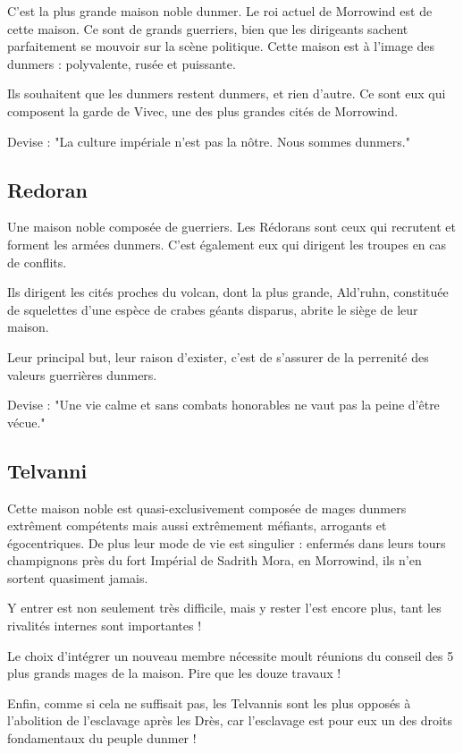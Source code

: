       C'est la plus grande maison noble dunmer. Le roi actuel de Morrowind est de cette maison. Ce sont de grands guerriers, bien que les dirigeants sachent parfaitement se mouvoir sur la scène politique. Cette maison est à l'image des dunmers : polyvalente, rusée et puissante.
      
      Ils souhaitent que les dunmers restent dunmers, et rien d'autre. Ce sont eux qui composent la garde de Vivec, une des plus grandes cités de Morrowind.
      
      Devise : "La culture impériale n'est pas la nôtre. Nous sommes dunmers."
    
    \subsection{Redoran}
    
      Une maison noble composée de guerriers. Les Rédorans sont ceux qui recrutent et forment les armées dunmers. C'est également eux qui dirigent les troupes en cas de conflits.
      
      Ils dirigent les cités proches du volcan, dont la plus grande, Ald'ruhn, constituée de squelettes d'une espèce de crabes géants disparus, abrite le siège de leur maison.
      
      Leur principal but, leur raison d'exister, c'est de s'assurer de la perrenité des valeurs guerrières dunmers.
      
      Devise : "Une vie calme et sans combats honorables ne vaut pas la peine d'être vécue."
    
    \subsection{Telvanni}
    
    Cette maison noble est quasi-exclusivement composée de mages dunmers extrêment compétents mais aussi extrêmement méfiants, arrogants et égocentriques. De plus leur mode de vie est singulier : enfermés dans leurs tours champignons près du fort Impérial de Sadrith Mora, en Morrowind, ils n'en sortent quasiment jamais.
    
    Y entrer est non seulement très difficile, mais y rester l'est encore plus, tant les rivalités internes sont importantes !
    
    Le choix d'intégrer un nouveau membre nécessite moult réunions du conseil des 5 plus grands mages de la maison. Pire que les douze travaux !
    
    Enfin, comme si cela ne suffisait pas, les Telvannis sont les plus opposés à l'abolition de l'esclavage après les Drès, car l'esclavage est pour eux un des droits fondamentaux du peuple dunmer !
    

